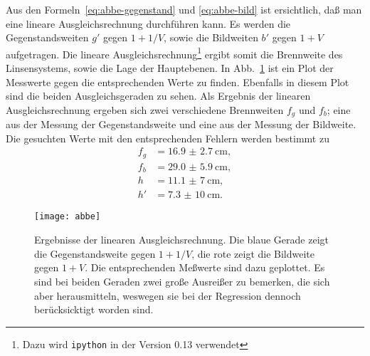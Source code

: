 Aus den Formeln~\eqref{eq:abbe-gegenstand} und \eqref{eq:abbe-bild} ist
ersichtlich, daß man eine lineare Ausgleichsrechnung durchführen
kann. Es werden die Gegenstandsweiten $g'$ gegen $1 + 1/V$, sowie die
Bildweiten $b'$ gegen $1 + V$ aufgetragen. Die lineare
Ausgleichsrechnung\footnote{Dazu wird \texttt{ipython} in der Version
  0.13 verwendet} ergibt somit die Brennweite des Linsensystems, sowie
die Lage der Hauptebenen.  In Abb.~\ref{fig:abbe} ist ein Plot der
Messwerte gegen die entsprechenden Werte zu finden. Ebenfalls in diesem
Plot sind die beiden Ausgleichsgeraden zu sehen.  Als Ergebnis der
linearen Ausgleichsrechnung ergeben sich zwei verschiedene Brennweiten
$f_g$ und $f_b$; eine aus der Messung der Gegenstandsweite und eine aus
der Messung der Bildweite.  Die gesuchten Werte mit den entsprechenden
Fehlern werden bestimmt zu
\begin{align*}
f_g &= \SI{16.9(27)}{\centi\metre}, \\
f_b &= \SI{29.0(59)}{\centi\metre}, \\
h   &= \SI{11.1(70)}{\centi\metre}, \\
h'  &= \SI{7.3(100)}{\centi\metre}.
\end{align*}

\begin{figure}
  \centering
  \texttt{[image: abbe]}
  \caption{Ergebnisse der linearen Ausgleichsrechnung. Die blaue Gerade
    zeigt  die Gegenstandsweite gegen $1 + 1/V$, die rote zeigt die Bildweite gegen $1 + V$.
    Die entsprechenden Meßwerte sind dazu
    geplottet. Es sind bei beiden Geraden zwei große Ausreißer zu
    bemerken, die sich aber herausmitteln, weswegen sie bei der
    Regression dennoch berücksicktigt worden sind.}
  \label{fig:abbe}
\end{figure}